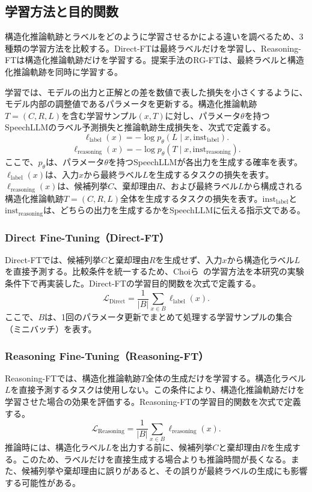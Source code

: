 \documentclass[11pt,a4paper]{ltjsarticle}
\begin{document}
\subsection{学習方法と目的関数}
構造化推論軌跡とラベルをどのように学習させるかによる違いを調べるため、3種類の学習方法を比較する。Direct-FTは最終ラベルだけを学習し、Reasoning-FTは構造化推論軌跡だけを学習する。提案手法のRG-FTは、最終ラベルと構造化推論軌跡を同時に学習する。

学習では、モデルの出力と正解との差を数値で表した損失を小さくするように、モデル内部の調整値であるパラメータを更新する。構造化推論軌跡$T=(C,R,L)$を含む学習サンプル$(x,T)$に対し、パラメータ$\theta$を持つSpeechLLMのラベル予測損失と推論軌跡生成損失を、次式で定義する。
\begin{equation}
\ell_{\mathrm{label}}(x)=-\log p_\theta(L\mid x,\mathrm{inst}_{\mathrm{label}}).
\tag{5}
\end{equation}
\begin{equation}
\ell_{\mathrm{reasoning}}(x)=-\log p_\theta(T\mid x,\mathrm{inst}_{\mathrm{reasoning}}).
\tag{6}
\end{equation}
ここで、$p_\theta$は、パラメータ$\theta$を持つSpeechLLMが各出力を生成する確率を表す。$\ell_{\mathrm{label}}(x)$は、入力$x$から最終ラベル$L$を生成するタスクの損失を表す。$\ell_{\mathrm{reasoning}}(x)$は、候補列挙$C$、棄却理由$R$、および最終ラベル$L$から構成される構造化推論軌跡$T=(C,R,L)$全体を生成するタスクの損失を表す。$\mathrm{inst}_{\mathrm{label}}$と$\mathrm{inst}_{\mathrm{reasoning}}$は、どちらの出力を生成するかをSpeechLLMに伝える指示文である。

\subsubsection{Direct Fine-Tuning（Direct-FT）}
Direct-FTでは、候補列挙$C$と棄却理由$R$を生成せず、入力$x$から構造化ラベル$L$を直接予測する。比較条件を統一するため、Choiら~\cite{choi2025exploring}の学習方法を本研究の実験条件下で再実装した。Direct-FTの学習目的関数を次式で定義する。
\begin{equation}
\mathcal{L}_{\mathrm{Direct}}=\frac{1}{|B|}\sum_{x\in B}\ell_{\mathrm{label}}(x).
\tag{7}
\end{equation}
ここで、$B$は、1回のパラメータ更新でまとめて処理する学習サンプルの集合（ミニバッチ）を表す。

\subsubsection{Reasoning Fine-Tuning（Reasoning-FT）}
Reasoning-FTでは、構造化推論軌跡$T$全体の生成だけを学習する。構造化ラベル$L$を直接予測するタスクは使用しない。この条件により、構造化推論軌跡だけを学習させた場合の効果を評価する。Reasoning-FTの学習目的関数を次式で定義する。
\begin{equation}
\mathcal{L}_{\mathrm{Reasoning}}=\frac{1}{|B|}\sum_{x\in B}\ell_{\mathrm{reasoning}}(x).
\tag{8}
\end{equation}
推論時には、構造化ラベル$L$を出力する前に、候補列挙$C$と棄却理由$R$を生成する。このため、ラベルだけを直接生成する場合よりも推論時間が長くなる。また、候補列挙や棄却理由に誤りがあると、その誤りが最終ラベルの生成にも影響する可能性がある。
\end{document}
